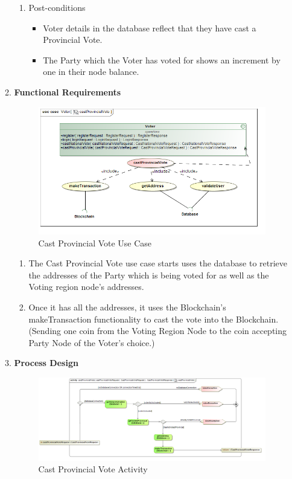 \begin{enumerate}
\begin{enumerate}
\begin{enumerate}
			\item Post-conditions
			\begin{itemize}
				\item Voter details in the database reflect that they have cast a Provincial Vote. 
				\item The Party which the Voter has voted for shows an increment by one in their node balance. 
			\end{itemize}
		\end{enumerate}
		
		\item \textbf{Functional Requirements}
		\begin{figure}[H]
			\centering
			\includegraphics[width=0.75\linewidth]{../Images/Voter/UseCases/castProvincialVote_useCase.png}
			\caption{Cast Provincial Vote Use Case}
		\end{figure}
		
		\begin{enumerate}
			\item The Cast Provincial Vote use case starts uses the database to retrieve the addresses of the Party which is being voted for as well as the Voting region node's addresses.   
			\item Once it has all the addresses, it uses the Blockchain's makeTransaction functionality to cast the vote into the Blockchain. (Sending one coin from the Voting Region Node to the coin accepting Party Node of the Voter's choice.) 
		\end{enumerate}
		
		
		
		
		\item \textbf{Process Design}
		\begin{figure}[H]
			\centering
			\includegraphics[width=0.75\linewidth]{../Images/Voter/ActivityDiagrams/castProvincialVote_activity.png}
			\caption{Cast Provincial Vote Activity}
		\end{figure}
		

\end{enumerate}
\end{enumerate}

